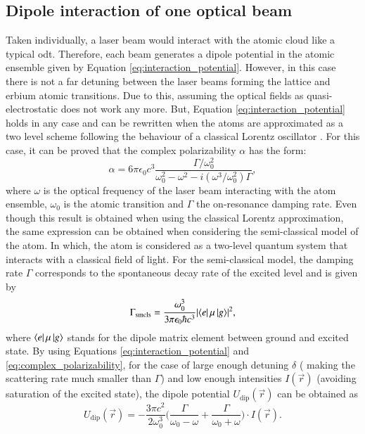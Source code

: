 \subsection{Dipole interaction of one optical beam}

Taken individually, a laser beam would interact with the atomic cloud like a typical \acf{odt}. Therefore, each beam generates a dipole potential in the atomic ensemble given by Equation \eqref{eq:interaction_potential}. However, in this case there is not a far detuning between the laser beams forming the lattice and erbium atomic transitions. Due to this, assuming the optical fields as quasi-electrostatic does not work any more. But, Equation \eqref{eq:interaction_potential} holds in any case and can be rewritten when the atoms are approximated as a two level scheme following the behaviour of a classical Lorentz oscillator \cite{Grimm2000}. For this case, it can be proved that the complex polarizability $\alpha$ has the form:
\begin{equation}\label{eq:complex_polarizability}
	\alpha = 6 \pi \epsilon_0 c^3 \frac{\Gamma/\omega_0^2}{\omega_0^2 -\omega^2 -i(\omega^3/\omega_0^2)\Gamma},
\end{equation} 
where $\omega$ is the optical frequency of the laser beam interacting with the atom ensemble, $\omega_0$ is the atomic transition and $\Gamma$ the on-resonance damping rate. Even though this result is obtained when using the classical Lorentz approximation, the same expression can be obtained when considering the semi-classical model of the atom. In which, the atom is considered as a two-level quantum system that interacts with a classical field of light. For the semi-classical model, the damping rate $\Gamma$ corresponds to the spontaneous decay rate of the excited level and is given by
\begin{equation}\label{eq:semiclassical_damping_rate}
	\Gamma_\text{smcls} = \frac{\omega_0^3}{3\pi\epsilon_0 \hbar c^3} \mathopen|\bra{e}\mu\ket{g}\mathclose|^2,
\end{equation}
where $\bra{e}\mu\ket{g}$ stands for the dipole matrix element between ground and excited state. By using Equations \eqref{eq:interaction_potential} and \eqref{eq:complex_polarizability}, for the case of large enough detuning $\delta$ ( making the scattering rate much smaller than $\Gamma$) and low enough intensities $I(\vec{r})$ (avoiding saturation of the excited state), the dipole potential $U_{\text{dip}}(\vec{r})$ can be obtained as
\begin{equation}
	U_{\text{dip}}(\vec{r}) = -\frac{3\pi c^2}{2\omega_0^3} \bigg(\frac{\Gamma}{\omega_0-\omega} + \frac{\Gamma}{\omega_0+\omega}\bigg) \cdot I(\vec{r}).
\end{equation} 

